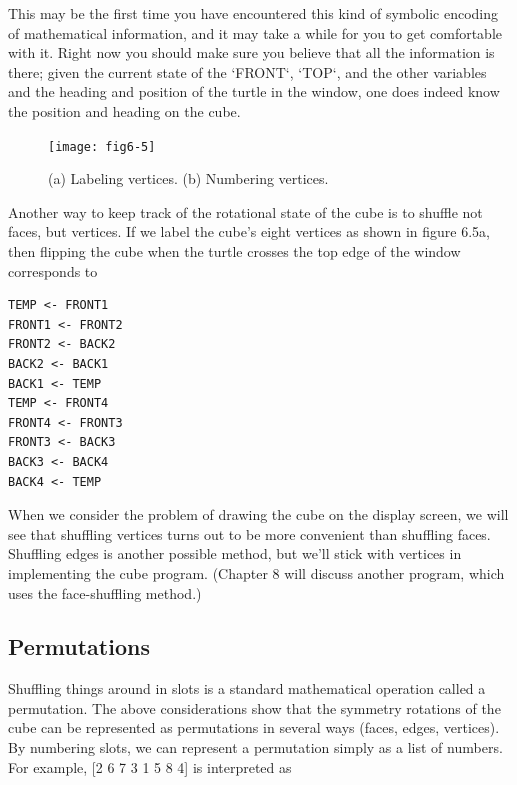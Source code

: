 \documentclass{book}
\begin{document}
This may be the first time you have encountered this kind of symbolic
encoding of mathematical information, and it may take a while for you
to get comfortable with it. Right now you should make sure you believe
that all the information is there; given the current state of the \textsc{`FRONT`},
\textsc{`TOP`}, and the other variables and the heading and position of the turtle
in the window, one does indeed know the position and heading on the
cube.

\begin{figure}
\begin{center}
\texttt{[image: fig6-5]}
\caption{(a) Labeling vertices. (b) Numbering vertices.}
\end{center}
\end{figure}

Another way to keep track of the rotational state of the cube is to
shuffle not faces, but vertices. If we label the cube's eight vertices as
shown in figure 6.5a, then flipping the cube when the turtle crosses the
top edge of the window corresponds to

\begin{verbatim}
TEMP <- FRONT1
FRONT1 <- FRONT2
FRONT2 <- BACK2
BACK2 <- BACK1
BACK1 <- TEMP
TEMP <- FRONT4
FRONT4 <- FRONT3
FRONT3 <- BACK3
BACK3 <- BACK4
BACK4 <- TEMP
\end{verbatim}
When we consider the problem of drawing the cube on the display
screen, we will see that shuffling vertices turns out to be more convenient
than shuffling faces. Shuffling edges is another possible method, but we'll
stick with vertices in implementing the cube program. (Chapter 8 will
discuss another program, which uses the face-shuffling method.)

\subsection{Permutations}

Shuffling things around in slots is a standard mathematical operation
called a permutation. The above considerations show that the symmetry
rotations of the cube can be represented as permutations in several ways
(faces, edges, vertices). By numbering slots, we can represent a permutation simply as a list of numbers. For example, [2 6 7 3 1 5 8 4] is
interpreted as
\end{document}
